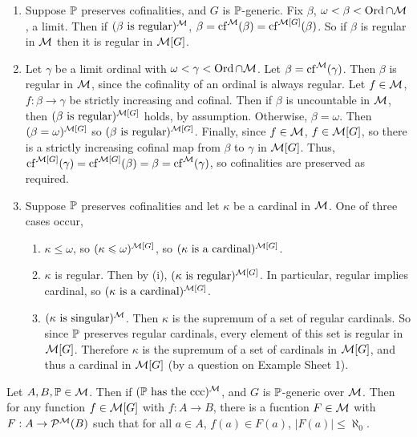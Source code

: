 \documentclass{article}
\begin{document}
    \begin{enumerate}
        \item[(i, $\Rightarrow$)] Suppose $\mathbb{P}$ preserves cofinalities, and $G$ is $\mathbb{P}$-generic. Fix $\beta$, $\omega < \beta < \operatorname{Ord} \cap \mathcal{M}$, a limit. Then if $(\text{$\beta$ is regular})^{\mathcal{M}}$, $\beta = \operatorname{cf}^{\mathcal{M}}(\beta) = \operatorname{cf}^{\mathcal{M}[G]}(\beta)$. So if $\beta$ is regular in $\mathcal{M}$ then it is regular in $\mathcal{M}[G]$.
        \item[(i, $\Leftarrow$)] Let $\gamma$ be a limit ordinal with $\omega < \gamma < \operatorname{Ord} \cap \mathcal{M}$. Let $\beta = \operatorname{cf}^{\mathcal{M}}(\gamma)$. Then $\beta$ is regular in $\mathcal{M}$, since the cofinality of an ordinal is always regular. Let $f \in \mathcal{M}$, $f: \beta \to \gamma$ be strictly increasing and cofinal. Then if $\beta$ is uncountable in $\mathcal{M}$, then $(\text{$\beta$ is regular})^{\mathcal{M}[G]}$ holds, by assumption. Otherwise, $\beta= \omega$. Then $(\beta = \omega)^{\mathcal{M}[G]}$ so $(\text{$\beta$ is regular})^{\mathcal{M}[G]}$. Finally, since $f \in \mathcal{M}$, $f \in \mathcal{M}[G]$, so there is a strictly increasing cofinal map from $\beta$ to $\gamma$ in $\mathcal{M}[G]$. Thus, $\operatorname{cf}^{\mathcal{M}[G]}(\gamma) = \operatorname{cf}^{\mathcal{M}[G]}(\beta) = \beta = \operatorname{cf}^{\mathcal{M}}(\gamma)$, so cofinalities are preserved as required.
        \item[(ii)] Suppose $\mathbb{P}$ preserves cofinalities and let $\kappa$ be a cardinal in $\mathcal{M}$. One of three cases occur, \begin{enumerate}
                  \item $\kappa \leq \omega$, so $(\kappa \leqslant \omega)^{\mathcal{M}[G]}$, so $(\text{$\kappa$ is a cardinal})^{\mathcal{M}[G]}$.
                  \item $\kappa$ is regular. Then by (i), $(\text{$\kappa$ is regular})^{\mathcal{M}[G]}$. In particular, regular implies cardinal, so $(\text{$\kappa$ is a cardinal})^{\mathcal{M}[G]}$.
                  \item $(\text{$\kappa$ is singular})^{\mathcal{M}}$. Then $\kappa$ is the supremum of a set of regular cardinals. So since $\mathbb{P}$ preserves regular cardinals, every element of this set is regular in $\mathcal{M}[G]$. Therefore $\kappa$ is the supremum of a set of cardinals in $\mathcal{M}[G]$, and thus a cardinal in $\mathcal{M}[G]$ (by a question on Example Sheet 1).
              \end{enumerate}
    \end{enumerate}
    \endproof
    \begin{fancylem}{}
        Let $A,B, \mathbb{P} \in \mathcal{M}$. Then if $(\text{$\mathbb{P}$ has the ccc})^{\mathcal{M}}$, and $G$ is $\mathbb{P}$-generic over $\mathcal{M}$. Then for any function $f \in \mathcal{M}[G]$ with $f : A \to B$, there is a fucntion $F \in \mathcal{M}$ with $F : A \to \mathcal{P}^{\mathcal{M}}(B)$ such that for all $a \in A$, $f(a) \in F(a)$, $|F(a)| \leq \aleph_{0}$.
    \end{fancylem}
\end{document}
